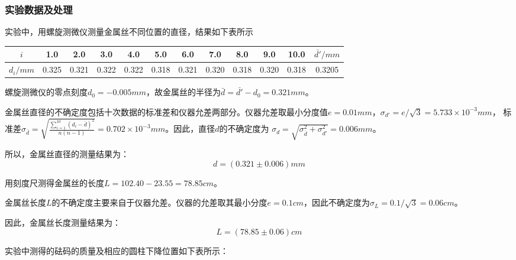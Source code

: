\documentclass{article}
\begin{document}
    \subsubsection{实验数据及处理}
    实验中，用螺旋测微仪测量金属丝不同位置的直径，结果如下表所示
    \begin{center}
        \begin{tabular}{|c|c|c|c|c|c|c|c|c|c|c|c|}
            \hline
            $i$   & 1.0   & 2.0   & 3.0   & 4.0   & 5.0   & 6.0   & 7.0   & 8.0   & 9.0   & 10.0  & $\bar{d'}/mm$ \\
            \hline
            $d_i/mm$ & 0.325  & 0.321  & 0.322  & 0.322  & 0.318  & 0.321  & 0.320  & 0.318  & 0.320  & 0.318  & 0.3205 \\
            \hline
        \end{tabular}%
    \end{center}

    螺旋测微仪的零点刻度$d_0=-0.005mm$，故金属丝的半径为$\bar{d}=\bar{d'}-d_0=0.321mm$。

    金属丝直径的不确定度包括十次数据的标准差和仪器允差两部分。仪器允差取最小分度值$e=0.01mm$，$\sigma_{d'}=e/\sqrt{3}=5.733\times 10^{-3}mm$，
    标准差$\sigma_{\bar{d}}=\sqrt{\frac{\sum_{i=1}^{10} (d_i-\bar{d})^2}{n(n-1)}}=0.702\times 10^{-3}mm$。因此，直径$d$的不确定度为
    $\sigma_d=\sqrt{\sigma_{\bar{d}}^2+\sigma_{d'}^2}=0.006mm$。

    所以，金属丝直径的测量结果为：
    $$d=(0.321\pm0.006)mm$$

    用刻度尺测得金属丝的长度$L=102.40-23.55=78.85cm$。

    金属丝长度$L$的不确定度主要来自于仪器允差。仪器的允差取其最小分度$e=0.1cm$，因此不确定度为$\sigma_L=0.1/\sqrt{3}=0.06cm$。

    因此，金属丝长度测量结果为：
    $$L=(78.85\pm0.06)cm$$

    实验中测得的砝码的质量及相应的圆柱下降位置如下表所示：
\end{document}
